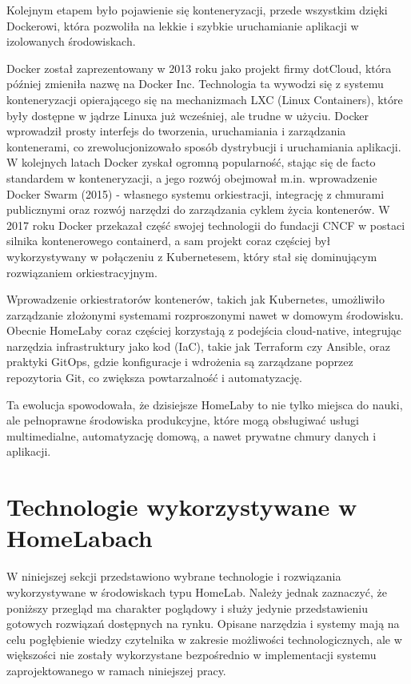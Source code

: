 Kolejnym etapem było pojawienie się konteneryzacji, przede wszystkim dzięki Dockerowi, która pozwoliła na lekkie i szybkie uruchamianie aplikacji w izolowanych środowiskach.

Docker został zaprezentowany w 2013 roku jako projekt firmy dotCloud, która później zmieniła nazwę na Docker Inc. Technologia ta wywodzi się z systemu konteneryzacji opierającego się na mechanizmach LXC (Linux Containers), które były dostępne w jądrze Linuxa już wcześniej, ale trudne w użyciu. Docker wprowadził prosty interfejs do tworzenia, uruchamiania i zarządzania kontenerami, co zrewolucjonizowało sposób dystrybucji i uruchamiania aplikacji. W kolejnych latach Docker zyskał ogromną popularność, stając się de facto standardem w konteneryzacji, a jego rozwój obejmował m.in. wprowadzenie Docker Swarm (2015) - własnego systemu orkiestracji, integrację z chmurami publicznymi oraz rozwój narzędzi do zarządzania cyklem życia kontenerów. W 2017 roku Docker przekazał część swojej technologii do fundacji CNCF w postaci silnika kontenerowego containerd, a sam projekt coraz częściej był wykorzystywany w połączeniu z Kubernetesem, który stał się dominującym rozwiązaniem orkiestracyjnym.

Wprowadzenie orkiestratorów kontenerów, takich jak Kubernetes, umożliwiło zarządzanie złożonymi systemami rozproszonymi nawet w domowym środowisku. Obecnie HomeLaby coraz częściej korzystają z podejścia cloud-native, integrując narzędzia infrastruktury jako kod (IaC), takie jak Terraform czy Ansible, oraz praktyki GitOps, gdzie konfiguracje i wdrożenia są zarządzane poprzez repozytoria Git, co zwiększa powtarzalność i automatyzację.

Ta ewolucja spowodowała, że dzisiejsze HomeLaby to nie tylko miejsca do nauki, ale pełnoprawne środowiska produkcyjne, które mogą obsługiwać usługi multimedialne, automatyzację domową, a nawet prywatne chmury danych i aplikacji.

\section{Technologie wykorzystywane w HomeLabach}

W niniejszej sekcji przedstawiono wybrane technologie i rozwiązania wykorzystywane w środowiskach typu HomeLab. Należy jednak zaznaczyć, że poniższy przegląd ma charakter poglądowy i służy jedynie przedstawieniu gotowych rozwiązań dostępnych na rynku. Opisane narzędzia i systemy mają na celu pogłębienie wiedzy czytelnika w zakresie możliwości technologicznych, ale w większości nie zostały wykorzystane bezpośrednio w implementacji systemu zaprojektowanego w ramach niniejszej pracy.

